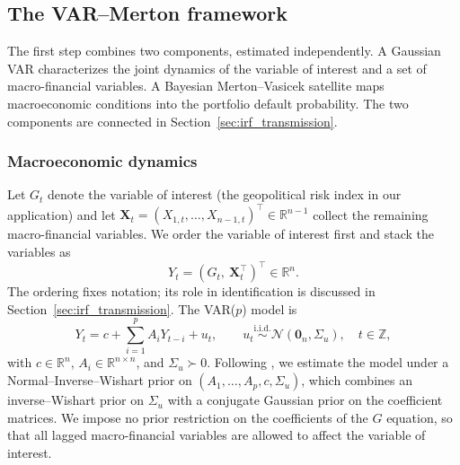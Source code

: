 \subsection{The VAR--Merton framework}\label{sec:var-merton framework}
The first step combines two components, estimated independently. A Gaussian VAR
characterizes the joint dynamics of the variable of interest and a set of
macro-financial variables. A Bayesian Merton--Vasicek satellite maps
macroeconomic conditions into the portfolio default probability. The two
components are connected in Section~\ref{sec:irf_transmission}.
\subsubsection{Macroeconomic dynamics}
Let $G_t$ denote the variable of interest (the geopolitical risk index in our
application) and let
$\mathbf{X}_t = (X_{1,t},\dots,X_{n-1,t})^\top \in \mathbb{R}^{n-1}$ collect the
remaining macro-financial variables. We order the variable of interest first and
stack the variables as
\[
    Y_t = (G_t,\ \mathbf{X}_t^\top)^\top \in \mathbb{R}^n.
\]
The ordering fixes notation; its role in identification is discussed in
Section~\ref{sec:irf_transmission}. The VAR($p$) model is
\begin{equation}
    Y_t = c + \sum_{i=1}^{p} A_i Y_{t-i} + u_t,\qquad
    u_t \stackrel{\text{i.i.d.}}{\sim} \mathcal N(\mathbf{0}_n, \Sigma_u),
    \quad t \in \mathbb{Z},
    \label{eq:var}
\end{equation}
with $c \in \mathbb{R}^n$, $A_i \in \mathbb{R}^{n \times n}$, and
$\Sigma_u \succ 0$. Following \citet{caldara2022geopolitical}, we estimate the
model under a Normal--Inverse--Wishart prior on $(A_1,\dots,A_p,c,\Sigma_u)$,
which combines an inverse--Wishart prior on $\Sigma_u$ with a conjugate Gaussian
prior on the coefficient matrices. We impose no prior restriction on the
coefficients of the $G$ equation, so that all lagged macro-financial variables
are allowed to affect the variable of interest.
